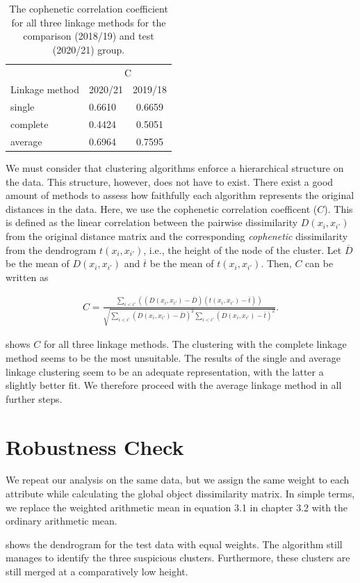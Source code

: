 \documentclass{edm_article}
\begin{document}
\begin{table}[h!]
	\centering
	\caption{The cophenetic correlation coefficient for all three linkage methods for the comparison (2018/19) and test (2020/21) group.}
	\label{tab:table_coph_cor_both}
		\begin{tabular}{@{}llc@{}}
			\toprule
			               & \multicolumn{2}{c}{C} \\ \cmidrule(l){2-3} 
			Linkage method & 2020/21   & 2019/18   \\ \midrule
			single         & 0.6610       & 0.6659     \\
			complete       & 0.4424      & 0.5051      \\
			average        & 0.6964      & 0.7595      \\ \bottomrule
		\end{tabular}%
\end{table}

 We must consider that clustering algorithms enforce a hierarchical structure on the data. This structure, however, does not have to exist. There exist a good amount of methods to assess how faithfully each algorithm represents the original distances in the data. Here, we use the cophenetic correlation coefficent ($C$). This is defined as the linear correlation between the pairwise dissimilarity $D(x_i, x_{i'})$ from the original distance matrix and the corresponding \textit{cophenetic} dissimilarity from the dendrogram $t(x_i, x_{i'})$, i.e., the height of the node of the cluster. Let $\overline{D}$ be the mean of $D(x_i, x_{i'})$ and $\overline{t}$ be the mean of $t(x_i, x_{i'})$. Then, $C$ can be written as

\begin{align}
C = \frac{\sum_{i<i'}\left(\left(D(x_i, x_{i'}) - \overline{D}\right)\left(t(x_i, x_{i'}) - \overline{t}\right)\right)}{\sqrt{\sum_{i<i'}\left(D(x_i, x_{i'}) - \overline{D}\right)^2 \sum_{i<i'}\left(D(x_i, x_{i'})-\overline{t}\right)^2}}.
\label{eq:coph_cor} \tag{B.1}
\end{align}

 shows $C$ for all three linkage methods. The clustering with the complete linkage method seems to be the most unsuitable. The results of the single and average linkage clustering seem to be an adequate representation, with the latter a slightly better fit. We therefore proceed with the average linkage method in all further steps.


\section{Robustness Check} \label{sec:robust}
We repeat our analysis on the same data, but we assign the same weight to each attribute while calculating the global object dissimilarity matrix. In simple terms, we replace the weighted arithmetic mean in equation 3.1 in chapter 3.2 with the ordinary arithmetic mean. 



 shows the dendrogram for the test data with equal weights. The algorithm still manages to identify the three suspicious clusters. Furthermore, these clusters are still merged at a comparatively low height. 



\balancecolumns
\end{document}
